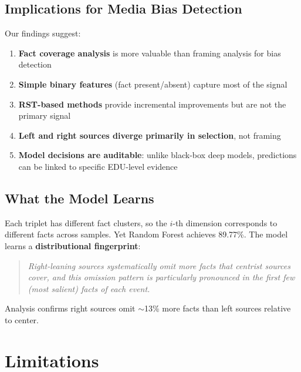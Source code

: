 \documentclass[11pt]{article}
\begin{document}
\subsection{Implications for Media Bias Detection}

Our findings suggest:
\begin{enumerate}
    \item \textbf{Fact coverage analysis} is more valuable than framing analysis for bias detection
    \item \textbf{Simple binary features} (fact present/absent) capture most of the signal
    \item \textbf{RST-based methods} provide incremental improvements but are not the primary signal
    \item \textbf{Left and right sources diverge primarily in selection}, not framing
    \item \textbf{Model decisions are auditable}: unlike black-box deep models, predictions can be linked to specific EDU-level evidence
\end{enumerate}

\subsection{What the Model Learns}

Each triplet has different fact clusters, so the $i$-th dimension corresponds to different facts across samples. Yet Random Forest achieves 89.77\%. The model learns a \textbf{distributional fingerprint}:

\begin{quote}
\textit{Right-leaning sources systematically omit more facts that centrist sources cover, and this omission pattern is particularly pronounced in the first few (most salient) facts of each event.}
\end{quote}

Analysis confirms right sources omit $\sim$13\% more facts than left sources relative to center.

\section{Limitations}
\end{document}
